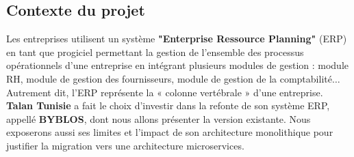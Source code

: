 \subsection{Contexte du projet}
Les entreprises utilisent un système \textbf{"Enterprise Ressource Planning"} (ERP) en tant que progiciel permettant la gestion de l’ensemble des processus opérationnels d’une entreprise en intégrant plusieurs modules de gestion : module RH, module de gestion des fournisseurs, module de gestion de la comptabilité$\dots$\\ 
Autrement dit, l’ERP représente la « colonne vertébrale » d’une entreprise. \textbf{Talan Tunisie} a fait le choix d’investir dans la refonte de son système ERP, appellé \textbf{BYBLOS}, dont nous allons présenter la version existante. Nous exposerons aussi ses limites et l'impact de son architecture monolithique pour justifier la migration vers une architecture microservices.
